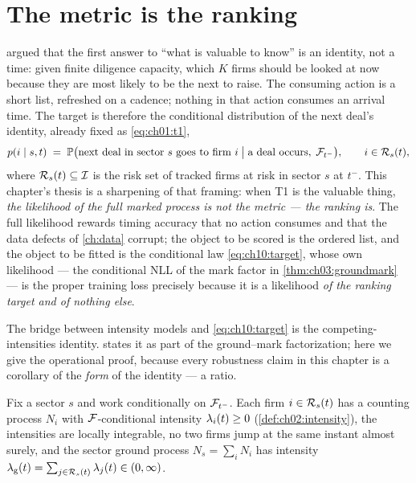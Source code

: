 
\section{The metric is the ranking}\label{ch10:sec:target}

 argued that the first answer to ``what is valuable to
know'' is an identity, not a time: given finite diligence capacity, which
$K$ firms should be looked at now because they are most likely to be the
next to raise. The consuming action is a short list, refreshed on a
cadence; nothing in that action consumes an arrival time. The target is
therefore the conditional distribution of the next deal's identity,
already fixed as \cref{eq:ch01:t1},
\begin{equation}\label{eq:ch10:target}
p(i \mid s, t)
 \;=\;
 \mathbb{P}\big(\text{next deal in sector } s \text{ goes to firm } i
 \;\big|\; \text{a deal occurs},\; \mathcal{F}_{t^-}\big),
 \qquad i \in \mathcal{R}_s(t),
\end{equation}
where $\mathcal{R}_s(t) \subseteq \mathcal{I}$ is the risk set of tracked firms at
risk in sector $s$ at $t^-$. This chapter's thesis is a sharpening of that
framing: when T1 is the valuable thing, \emph{the likelihood of the full
marked process is not the metric --- the ranking is}. The full likelihood
rewards timing accuracy that no action consumes and that the data defects
of \cref{ch:data} corrupt; the object to be scored is the ordered list,
and the object to be fitted is the conditional law
\cref{eq:ch10:target}, whose own likelihood --- the conditional NLL of the
mark factor in \cref{thm:ch03:groundmark} --- is the proper training
loss precisely because it is a likelihood \emph{of the ranking target and
of nothing else}.

The bridge between intensity models and \cref{eq:ch10:target} is the
competing-intensities identity.  states it as part of
the ground--mark factorization; here we give the operational proof,
because every robustness claim in this chapter is a corollary of the
\emph{form} of the identity --- a ratio.

\begin{assumption}\label{asm:ch10:intensities}
Fix a sector $s$ and work conditionally on $\mathcal{F}_{t^-}$. Each firm $i \in
\mathcal{R}_s(t)$ has a counting process $N_i$ with $\mathcal{F}$-conditional
intensity $\lambda_i(t) \ge 0$ (\cref{def:ch02:intensity}), the intensities
are locally integrable, no two firms jump at the same instant almost
surely, and the sector ground process $N_s = \sum_{i} N_i$ has intensity
$\lambda_{\mathrm g}(t) = \sum_{j \in \mathcal{R}_s(t)} \lambda_j(t) \in
(0,\infty)$.
\end{assumption}

